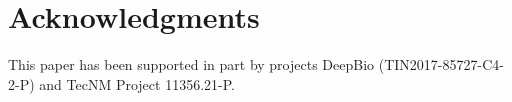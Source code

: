 \documentclass[runningheads]{llncs}
\begin{document}
\section*{Acknowledgments}

This paper has been supported in part by projects DeepBio (TIN2017-85727-C4-2-P)
and TecNM Project 11356.21-P.

\printbibliography
\end{document}
